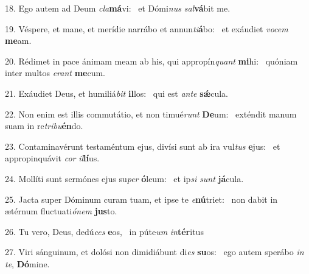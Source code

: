 18. Ego autem ad Deum \textit{cla}\textbf{má}vi: \ast\  et Dómi\textit{nus} \textit{sal}\textbf{vá}bit me.\

19. Véspere, et mane, et merídie narrábo et annun\textit{ti}\textbf{á}bo: \ast\  et exáudiet \textit{vo}\textit{cem} \textbf{me}am.\

20. Rédimet in pace ánimam meam ab his, qui appropín\textit{quant} \textbf{mi}hi: \ast\  quóniam inter multos \textit{e}\textit{rant} \textbf{me}cum.\

21. Exáudiet Deus, et humiliá\textit{bit} \textbf{il}los: \ast\  qui est \textit{an}\textit{te} \textbf{sǽ}cula.\

22. Non enim est illis commutátio, et non timué\textit{runt} \textbf{De}um: \ast\  exténdit manum suam in re\textit{tri}\textit{bu}\textbf{én}do.\

23. Contaminavérunt testaméntum ejus, divísi sunt ab ira vul\textit{tus} \textbf{e}jus: \ast\  et appropinquávit \textit{cor} \textit{il}\textbf{lí}us.\

24. Mollíti sunt sermónes ejus su\textit{per} \textbf{ó}leum: \ast\  et ip\textit{si} \textit{sunt} \textbf{já}cula.\

25. Jacta super Dóminum curam tuam, et ipse te \textit{e}\textbf{nú}triet: \ast\  non dabit in ætérnum fluctuati\textit{ó}\textit{nem} \textbf{jus}to.\

26. Tu vero, Deus, dedú\textit{ces} \textbf{e}os, \ast\  in púte\textit{um} \textit{in}\textbf{tér}itus\

27. Viri sánguinum, et dolósi non dimidiábunt di\textit{es} \textbf{su}os: \ast\  ego autem sperábo \textit{in} \textit{te}, \textbf{Dó}mine.\


